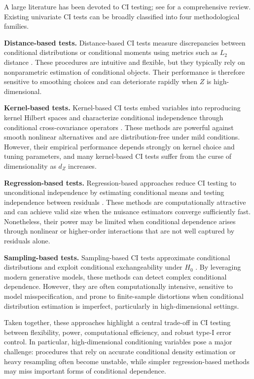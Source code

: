 \documentclass[12pt,reqno,oneside]{amsbook}
\theoremstyle{definition}
\theoremstyle{remark}
\begin{document}
A large literature has been devoted to CI testing; see \cite{LiFan2020} for a
comprehensive review. Existing univariate CI tests can be broadly classified
into four methodological families.

\textbf{Distance-based tests.}
Distance-based CI tests measure discrepancies between conditional distributions
or conditional moments using metrics such as $L_2$ distance
\citep{SuWhite2007,Su2014TestingCI,wang2015conditional,Su_White_2008}. These
procedures are intuitive and flexible, but they typically rely on nonparametric
estimation of conditional objects. Their performance is therefore sensitive to
smoothing choices and can deteriorate rapidly when $Z$ is high-dimensional.

\textbf{Kernel-based tests.}
Kernel-based CI tests embed variables into reproducing kernel Hilbert spaces and
characterize conditional independence through conditional cross-covariance
operators \citep{Fukumizu2007KernelMO,zhang2012kernelbased,strobl2017approximate}.
These methods are powerful against smooth nonlinear alternatives and are
distribution-free under mild conditions. However, their empirical performance
depends strongly on kernel choice and tuning parameters, and many kernel-based CI
tests suffer from the curse of dimensionality as $d_Z$ increases.

\textbf{Regression-based tests.}
Regression-based approaches reduce CI testing to unconditional independence by
estimating conditional means and testing independence between residuals
\citep{Hoyer2008ANM,Shah_2020,Zhang2017CausalDU,Zhang2023SCIT}. These methods are
computationally attractive and can achieve valid size when the nuisance
estimators converge sufficiently fast. Nonetheless, their power may be limited
when conditional dependence arises through nonlinear or higher-order
interactions that are not well captured by residuals alone.

\textbf{Sampling-based tests.}
Sampling-based CI tests approximate conditional distributions and exploit
conditional exchangeability under $H_0$
\citep{bellot2019conditional,shi2021double,duong2022conditional}. By leveraging
modern generative models, these methods can detect complex conditional
dependence. However, they are often computationally intensive, sensitive to model
misspecification, and prone to finite-sample distortions when conditional
distribution estimation is imperfect, particularly in high-dimensional settings.

Taken together, these approaches highlight a central trade-off in CI testing
between flexibility, power, computational efficiency, and robust type-I error
control. In particular, high-dimensional conditioning variables pose a major
challenge: procedures that rely on accurate conditional density estimation or
heavy resampling often become unstable, while simpler regression-based methods
may miss important forms of conditional dependence.
\end{document}
